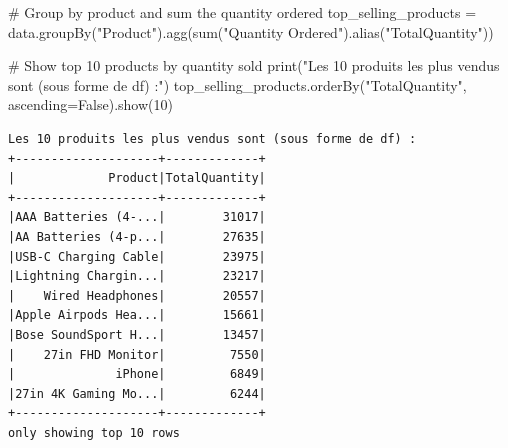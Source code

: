 \documentclass[
  letterpaper,
  DIV=11,
  numbers=noendperiod]{scrartcl}
\newenvironment{Shaded}{\begin{snugshade}}{\end{snugshade}}
\newcommand{\BuiltInTok}[1]{\textcolor[rgb]{0.00,0.23,0.31}{#1}}
\newcommand{\CommentTok}[1]{\textcolor[rgb]{0.37,0.37,0.37}{#1}}
\newcommand{\DecValTok}[1]{\textcolor[rgb]{0.68,0.00,0.00}{#1}}
\newcommand{\NormalTok}[1]{\textcolor[rgb]{0.00,0.23,0.31}{#1}}
\newcommand{\OperatorTok}[1]{\textcolor[rgb]{0.37,0.37,0.37}{#1}}
\newcommand{\StringTok}[1]{\textcolor[rgb]{0.13,0.47,0.30}{#1}}
\newcommand{\VariableTok}[1]{\textcolor[rgb]{0.07,0.07,0.07}{#1}}
\begin{document}
\begin{Shaded}
\begin{Highlighting}[]
\CommentTok{\# Group by product and sum the quantity ordered}
\NormalTok{top\_selling\_products }\OperatorTok{=}\NormalTok{ data.groupBy(}\StringTok{"Product"}\NormalTok{).agg(}\BuiltInTok{sum}\NormalTok{(}\StringTok{"\textasciigrave{}Quantity Ordered\textasciigrave{}"}\NormalTok{).alias(}\StringTok{"TotalQuantity"}\NormalTok{))}

\CommentTok{\# Show top 10 products by quantity sold}
\BuiltInTok{print}\NormalTok{(}\StringTok{"Les 10 produits les plus vendus sont (sous forme de df) :"}\NormalTok{)}
\NormalTok{top\_selling\_products.orderBy(}\StringTok{"TotalQuantity"}\NormalTok{, ascending}\OperatorTok{=}\VariableTok{False}\NormalTok{).show(}\DecValTok{10}\NormalTok{)}

\end{Highlighting}
\end{Shaded}

\begin{verbatim}
Les 10 produits les plus vendus sont (sous forme de df) :
+--------------------+-------------+
|             Product|TotalQuantity|
+--------------------+-------------+
|AAA Batteries (4-...|        31017|
|AA Batteries (4-p...|        27635|
|USB-C Charging Cable|        23975|
|Lightning Chargin...|        23217|
|    Wired Headphones|        20557|
|Apple Airpods Hea...|        15661|
|Bose SoundSport H...|        13457|
|    27in FHD Monitor|         7550|
|              iPhone|         6849|
|27in 4K Gaming Mo...|         6244|
+--------------------+-------------+
only showing top 10 rows
\end{verbatim}
\end{document}
